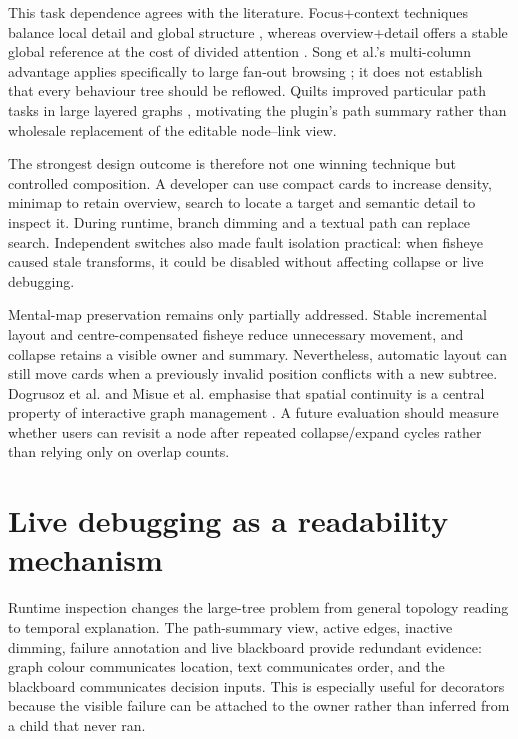 This task dependence agrees with the literature. Focus+context techniques balance local detail and global structure \parencite{furnas1986fisheye,lamping1995hyperbolic}, whereas overview+detail offers a stable global reference at the cost of divided attention \parencite{cockburn2008review}. Song et al.'s multi-column advantage applies specifically to large fan-out browsing \parencite{song2010largefanout}; it does not establish that every behaviour tree should be reflowed. Quilts improved particular path tasks in large layered graphs \parencite{bae2011quilts}, motivating the plugin's path summary rather than wholesale replacement of the editable node--link view.

The strongest design outcome is therefore not one winning technique but controlled composition. A developer can use compact cards to increase density, minimap to retain overview, search to locate a target and semantic detail to inspect it. During runtime, branch dimming and a textual path can replace search. Independent switches also made fault isolation practical: when fisheye caused stale transforms, it could be disabled without affecting collapse or live debugging.

Mental-map preservation remains only partially addressed. Stable incremental layout and centre-compensated fisheye reduce unnecessary movement, and collapse retains a visible owner and summary. Nevertheless, automatic layout can still move cards when a previously invalid position conflicts with a new subtree. Dogrusoz et al. and Misue et al. emphasise that spatial continuity is a central property of interactive graph management \parencite{dogrusoz2018complexity,misue1995mentalmap}. A future evaluation should measure whether users can revisit a node after repeated collapse/expand cycles rather than relying only on overlap counts.

\section{Live debugging as a readability mechanism}

Runtime inspection changes the large-tree problem from general topology reading to temporal explanation. The path-summary view, active edges, inactive dimming, failure annotation and live blackboard provide redundant evidence: graph colour communicates location, text communicates order, and the blackboard communicates decision inputs. This is especially useful for decorators because the visible failure can be attached to the owner rather than inferred from a child that never ran.

